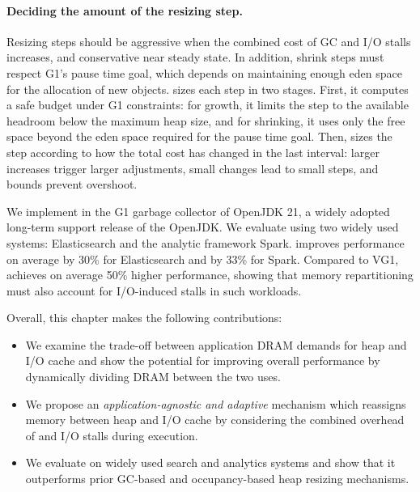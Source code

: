\paragraph{\textbf{Deciding the amount of the resizing step.}}
Resizing steps should be aggressive when the combined cost of GC and I/O stalls increases, and conservative near steady state.
In addition, shrink steps must respect G1’s pause time goal, which depends on maintaining enough eden space for the allocation of new objects.
\flexheapName{} sizes each step in two stages.
First, it computes a safe budget under G1 constraints: for growth, it limits the step to the available headroom below the maximum heap size, and for shrinking, it uses only the free space beyond the eden space required for the pause time goal.
Then, \flexheapName{} sizes the step according to how the total cost has changed in the last interval: larger increases trigger larger adjustments, small changes lead to small steps, and bounds prevent overshoot.

We implement \flexheapName{} in the G1 garbage collector of OpenJDK 21, a widely adopted long-term support release of the OpenJDK.
We evaluate \flexheapName{} using two widely used systems: Elasticsearch and the analytic framework Spark.
\flexheapName{} improves performance on average by 30\% for Elasticsearch and by 33\% for Spark.
Compared to VG1, \flexheapName{} achieves on average 50\% higher performance, showing that memory repartitioning must also account for I/O-induced stalls in such workloads.

Overall, this chapter makes the following contributions:

\begin{itemize}
	\item We examine the trade-off between application DRAM demands for heap and I/O cache and show the potential for improving overall performance by dynamically dividing DRAM between the two uses.

	\item We propose an \emph{application-agnostic and adaptive} mechanism which reassigns memory between heap and I/O cache by considering the combined overhead of \flexheapGC{} and I/O stalls during execution.

	\item We evaluate \flexheapName{} on widely used search and analytics systems and show that it outperforms prior GC-based and occupancy-based heap resizing mechanisms.

\end{itemize}
